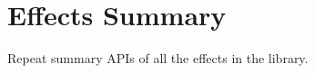 \section{Effects Summary}

\label{sect:appendix}

Repeat summary APIs of all the effects in the library.
